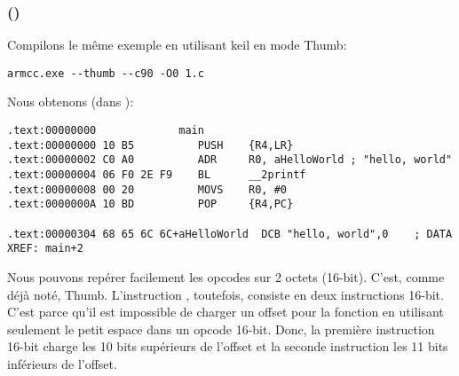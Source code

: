 \subsubsection{\NonOptimizingKeilVI (\ThumbMode)}

Compilons le même exemple en utilisant keil en mode Thumb:

\begin{lstlisting}
armcc.exe --thumb --c90 -O0 1.c 
\end{lstlisting}

Nous obtenons (dans \IDA):

\begin{lstlisting}[caption=\NonOptimizingKeilVI (\ThumbMode) + \IDA,style=customasmARM]
.text:00000000             main
.text:00000000 10 B5          PUSH    {R4,LR}
.text:00000002 C0 A0          ADR     R0, aHelloWorld ; "hello, world"
.text:00000004 06 F0 2E F9    BL      __2printf
.text:00000008 00 20          MOVS    R0, #0
.text:0000000A 10 BD          POP     {R4,PC}

.text:00000304 68 65 6C 6C+aHelloWorld  DCB "hello, world",0    ; DATA XREF: main+2
\end{lstlisting}

Nous pouvons repérer facilement les opcodes sur 2 octets (16-bit). C'est, comme déjà noté, Thumb.
L'instruction , toutefois, consiste en deux instructions 16-bit.
C'est parce qu'il est impossible de charger un offset pour la fonction \printf
en utilisant seulement le petit espace dans un opcode 16-bit.
Donc, la première instruction 16-bit charge les 10 bits supérieurs de l'offset
et la seconde instruction les 11 bits inférieurs de l'offset.


